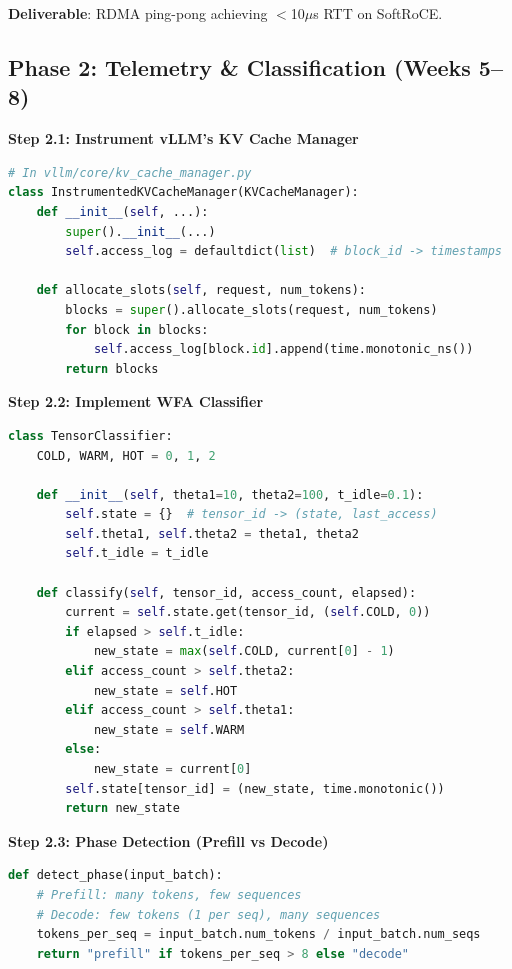 \documentclass[10pt,letterpaper]{article}
\begin{document}
\textbf{Deliverable}: RDMA ping-pong achieving $<$10$\mu$s RTT on SoftRoCE.

\subsection{Phase 2: Telemetry \& Classification (Weeks 5--8)}

\textbf{Step 2.1: Instrument vLLM's KV Cache Manager}
\begin{lstlisting}[language=Python]
# In vllm/core/kv_cache_manager.py
class InstrumentedKVCacheManager(KVCacheManager):
    def __init__(self, ...):
        super().__init__(...)
        self.access_log = defaultdict(list)  # block_id -> timestamps
        
    def allocate_slots(self, request, num_tokens):
        blocks = super().allocate_slots(request, num_tokens)
        for block in blocks:
            self.access_log[block.id].append(time.monotonic_ns())
        return blocks
\end{lstlisting}

\textbf{Step 2.2: Implement WFA Classifier}
\begin{lstlisting}[language=Python]
class TensorClassifier:
    COLD, WARM, HOT = 0, 1, 2
    
    def __init__(self, theta1=10, theta2=100, t_idle=0.1):
        self.state = {}  # tensor_id -> (state, last_access)
        self.theta1, self.theta2 = theta1, theta2
        self.t_idle = t_idle
        
    def classify(self, tensor_id, access_count, elapsed):
        current = self.state.get(tensor_id, (self.COLD, 0))
        if elapsed > self.t_idle:
            new_state = max(self.COLD, current[0] - 1)
        elif access_count > self.theta2:
            new_state = self.HOT
        elif access_count > self.theta1:
            new_state = self.WARM
        else:
            new_state = current[0]
        self.state[tensor_id] = (new_state, time.monotonic())
        return new_state
\end{lstlisting}

\textbf{Step 2.3: Phase Detection (Prefill vs Decode)}
\begin{lstlisting}[language=Python]
def detect_phase(input_batch):
    # Prefill: many tokens, few sequences
    # Decode: few tokens (1 per seq), many sequences
    tokens_per_seq = input_batch.num_tokens / input_batch.num_seqs
    return "prefill" if tokens_per_seq > 8 else "decode"
\end{lstlisting}
\end{document}
